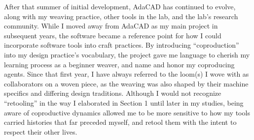 
After that summer of initial development, AdaCAD has continued to evolve, along with my weaving practice, other tools in the lab, and the lab's research community. While I moved away from AdaCAD as my main project in subsequent years, the software became a reference point for how I could incorporate software tools into craft practices. By introducing ``coproduction'' into my design practice's vocabulary, the project gave me language to cherish my learning process as a beginner weaver, and name and honor my coproducing agents. Since that first year, I have always referred to the loom(s) I wove with as collaborators on a woven piece, as the weaving was also shaped by their machine specifics and differing design traditions. Although I would not recognize ``retooling'' in the way I elaborated in Section 1 until later in my studies, being aware of coproductive dynamics allowed me to be more sensitive to how my tools carried histories that far preceded myself, and retool them with the intent to respect their other lives. 
